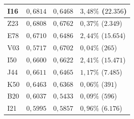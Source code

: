 \begin{table}[ht!]
\begin{tabular}{
        >{\centering\arraybackslash}m{} | >{\centering\arraybackslash}m{} | >{\centering\arraybackslash}m{} | >{\centering\arraybackslash}m{}}
        \hline
        I16 & $0,6814$ & $0,6468$ & $3,48\%$ ($22.356$) \\
        \hline
        Z23 & $0,6808$ & $0,6762$ & $0,37\%$ ($2.349$) \\
        \hline
        E78 & $0,6710$ & $0,6486$ & $2,44\%$ ($15.654$) \\
        \hline
        V03 & $0,5717$ & $0,6702$ & $0,04\%$ ($265$) \\
        \hline
        I50 & $0,6600$ & $0,6622$ & $2,41\%$ ($15.471$) \\
        \hline
        J44 & $0,6611$ & $0,6465$ & $1,17\%$ ($7.485$) \\
        \hline
        K50 & $0,6463$ & $0,6368$ & $0,06\%$ ($391$) \\
        \hline
        B20 & $0,6037$ & $0,5433$ & $0,09\%$ ($596$) \\
        \hline
        I21 & $0,5995$ & $0,5857$ & $0,96\%$ ($6.176$) \\
        \hline
    \end{tabular}
\end{table}

